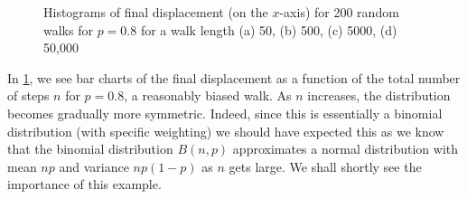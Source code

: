 \documentclass[main.tex]{subfiles}
\begin{document}
\begin{figure}
\centering
\begin{subfigure}[t]{0.24\textwidth}
	\centering
	
\end{subfigure}
\begin{subfigure}[t]{0.24\textwidth}
	\centering
	
\end{subfigure}
\begin{subfigure}[t]{0.24\textwidth}
	\centering
	
\end{subfigure}
\begin{subfigure}[t]{0.24\textwidth}
	\centering
	
\end{subfigure}
\caption{Histograms of final displacement (on the $x$-axis) for 200 random walks for $p=0.8$ for a walk length (a) 50, (b) 500, (c) 5000, (d) 50,000}
\label{bitonorm}
\end{figure}

\begin{nem}
In \cref{bitonorm}, we see bar charts of the final displacement as a function of the total number of steps $n$ for $p=0.8$, a reasonably biased walk. As $n$ increases, the distribution becomes gradually more symmetric. Indeed, since this is essentially a binomial distribution (with specific weighting) we should have expected this as we know that the binomial distribution $B(n,p)$ approximates a normal distribution with mean $np$ and variance $np(1-p)$ as $n$ gets large. We shall shortly see the importance of this example.
\end{nem}
\end{document}
